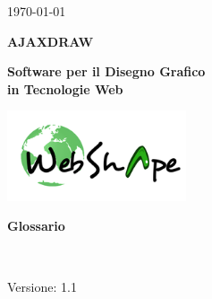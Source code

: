 
\title{\TITOLODOC}
\author{Mirco Geremia}



\renewcommand{\insertversion}{1.1} %
\renewcommand{\TITOLODOC}{Glossario} %
\renewcommand{\glosspath}{.\glossario} %

\begin{titlepage}
\begin{center}
	\begin{Large}	\today \end{Large}
\end{center}

\vspace{20pt}

\begin{center}
	\begin{Huge}
				\textbf{AJAXDRAW}
	\end{Huge}
\end{center}			

\begin{center}
	\begin{large}
				\textbf{Software per il Disegno Grafico\\ in Tecnologie Web}
	\end{large}
\end{center}			

\vspace{20pt}

\begin{center}
\includegraphics[width=150pt]{../logo/logo}
\end{center}

\vspace{170pt}
\begin{center} %
	\begin{Huge}
				\textbf{\TITOLODOC}
	\end{Huge}
			\\
\end{center}
\vspace{210pt}
\begin{center}
Versione: \insertversion
\end{center}
\end{titlepage}

